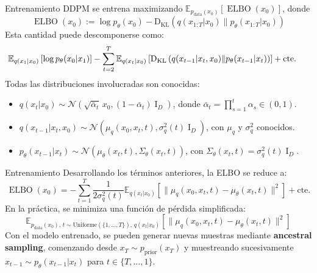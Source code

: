 \documentclass{beamer}
\begin{document}
\begin{frame}{Entrenamiento}
    DDPM se entrena maximizando $\mathbb{E}_{p_\text{data}(x_0)}\left[\operatorname{ELBO}(x_0)\right]$, donde
    \begin{equation*}
        \operatorname{ELBO}(x_0) := \log p_\theta(x_0)-\operatorname{D_{KL}}\left(q(x_{1:T}|x_0)\| p_\theta(x_{1:T}|x_0)\right)
    \end{equation*}
    Esta cantidad puede descomponerse como:
    \begin{equation*}
        \hspace{-0.5cm}
        \mathbb{E}_{q(x_1|x_0)}\left[\log p_\theta(x_0|x_1)\right]- \sum_{t=2}^T \mathbb{E}_{q(x_t|x_0)}\left[\operatorname{D_{KL}}\left(q(x_{t-1}|x_t,x_0)\|p_\theta(x_{t-1}|x_t)\right)\right]+\text{cte.}
    \end{equation*}
    Todas las distribuciones involucradas son conocidas:
    \begin{itemize}
        \item $q(x_t|x_0)\sim\mathcal{N}(\sqrt{\bar\alpha_t}\,x_0,(1-\bar\alpha_t)\operatorname{I}_D)$, donde $\bar\alpha_t=\prod\limits_{s=1}^t \alpha_s\in(0,1)$.
        \item $q(x_{t-1}|x_t,x_0)\sim\mathcal{N}(\mu_q(x_0,x_t,t),\sigma_q^2(t)\operatorname{I}_D)$, con $\mu_q$ y $\sigma_q^2$ conocidos.
        \item $p_\theta(x_{t-1}|x_t)\sim\mathcal{N}\left(\mu_\theta(x_t,t),\Sigma_\theta(x_t,t)\right)$, con $\Sigma_\theta(x_t,t)=\sigma_q^2(t)\operatorname{I}_D$.
    \end{itemize}
\end{frame}

\begin{frame}{Entrenamiento}
    Desarrollando los términos anteriores, la ELBO se reduce a:
    \begin{equation*}
        \operatorname{ELBO}(x_0) =
        - \sum_{t=1}^T \frac{1}{2\sigma_q^2(t)}\mathbb{E}_{q(x_t|x_0)}\left[\|\mu_q(x_0,x_t,t)-\mu_\theta(x_t,t)\|^2\right]+\text{cte.}
    \end{equation*}
    En la práctica, se minimiza una función de pérdida simplificada:
    \begin{equation*}
        \mathbb{E}_{p_\text{data}(x_0),\,t\sim\text{Uniforme}(\{1,\ldots,T\}),\,q(x_t|x_0)}\left[\|\mu_q(x_0,x_t,t)-\mu_\theta(x_t,t)\|^2\right]
    \end{equation*}
    Con el modelo entrenado, se pueden generar nuevas muestras mediante \textbf{ancestral sampling}, comenzando desde $x_T\sim p_{\text{prior}}(x_T)$ y muestreando sucesivamente $x_{t-1}\sim p_\theta(x_{t-1}|x_t)$ para $t\in\{T,\ldots,1\}$.
\end{frame}
\end{document}
